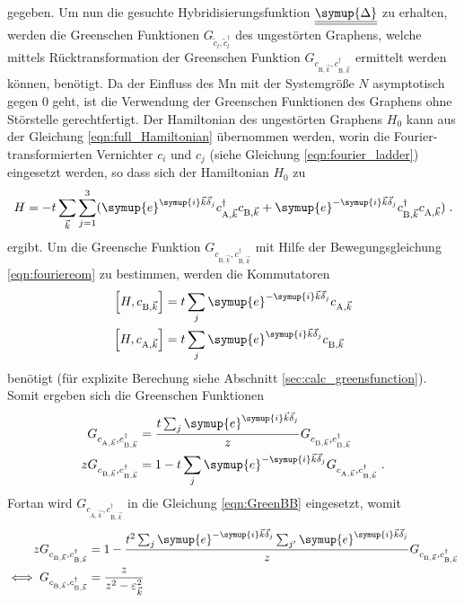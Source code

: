 gegeben.
Um nun die gesuchte Hybridisierungsfunktion $\underline{\underline{\symup{\Delta}}}$ zu erhalten, werden die Greenschen Funktionen
$G_{\tilde{c}_l, \tilde{c}_l^{\dagger}}$ des ungestörten Graphens, welche mittels Rücktransformation der Greenschen Funktion 
$G_{c_{\text{B}, \vec{k}}, c_{\text{B}, \vec{k}}^\dagger}$ ermittelt werden können, benötigt.
Da der Einfluss des Mn mit der Systemgröße $N$ asymptotisch gegen 0 geht, ist die Verwendung der 
Greenschen Funktionen des Graphens ohne Störstelle gerechtfertigt.
Der Hamiltonian des ungestörten Graphens $H_0$ kann aus der Gleichung \eqref{eqn:full_Hamiltonian} übernommen werden,
worin die Fourier-transformierten Vernichter $c_i$ und $c_j$ (siehe Gleichung \eqref{eqn:fourier_ladder}) eingesetzt werden,
so dass sich der Hamiltonian $H_0$ zu  
\begin{equation}
    H = -t \sum_{\vec{k}}\sum_{j=1}^3( \symup{e}^{\symup{i}\vec{k}\vec{\delta}_j}c^\dagger_{\text{A},\vec{k}} c_{\text{B},\vec{k}} + \symup{e}^{-\symup{i}\vec{k}\vec{\delta}_j}c^\dagger_{\text{B},\vec{k}} c_{\text{A},\vec{k}} ) \; .
\end{equation} 
ergibt.
Um die Greensche Funktion $G_{c_{\text{B}, \vec{k}}, c_{\text{B}, \vec{k}}^\dagger}$ mit Hilfe der Bewegungsgleichung \eqref{eqn:fouriereom} zu bestimmen, werden die Kommutatoren
\begin{align}
    \left [H,  c_{\text{B},\vec{k}} \right ] &= t \sum_j \symup{e}^{-\symup{i}\vec{k}\vec{\delta}_j} c_{\text{A},\vec{k}} \label{eqn:test} \\
    \left [H,  c_{\text{A},\vec{k}} \right ] &= t \sum_j \symup{e}^{\symup{i}\vec{k}\vec{\delta}_j} c_{\text{B},\vec{k}}
\end{align}
benötigt (für explizite Berechung siehe Abschnitt \ref{sec:calc_greensfunction}).
Somit ergeben sich die Greenschen Funktionen
\begin{align}
    G_{c_{\text{A},\vec{k}}, c^\dagger_{\text{B},\vec{k}}} &=  \frac{t\sum_j \symup{e}^{\symup{i}\vec{k}\vec{\delta}_j}}{z} G_{c_{\text{B},\vec{k}}, c^\dagger_{\text{B},\vec{k}}}\\
    zG_{c_{\text{B},\vec{k}}, c^\dagger_{\text{B},\vec{k}}} &= 1 -  t\sum_j \symup{e}^{-\symup{i}\vec{k}\vec{\delta}_j} G_{c_{\text{A},\vec{k}}, c^\dagger_{\text{B},\vec{k}}} \; . \label{eqn:GreenBB}
\end{align}
Fortan wird $G_{c_{\text{A},\vec{k}}, c^\dagger_{\text{B},\vec{k}}}$ in die Gleichung \eqref{eqn:GreenBB} eingesetzt, womit
\begin{align}
    zG_{c_{\text{B},\vec{k}}, c^\dagger_{\text{B},\vec{k}}} &= 1 - \frac{t^2\sum_j \symup{e}^{-\symup{i}\vec{k}\vec{\delta}_j} \sum_{j'} \symup{e}^{\symup{i}\vec{k}\vec{\delta}_{j}} }{z} G_{c_{\text{B},\vec{k}}, c^\dagger_{\text{B},\vec{k}}} \\
    \iff G_{c_{\text{B},\vec{k}}, c^\dagger_{\text{B},\vec{k}}} &= \frac{z}{z^2 - \varepsilon^2_{\vec{k}}  } \; 
\end{align}
